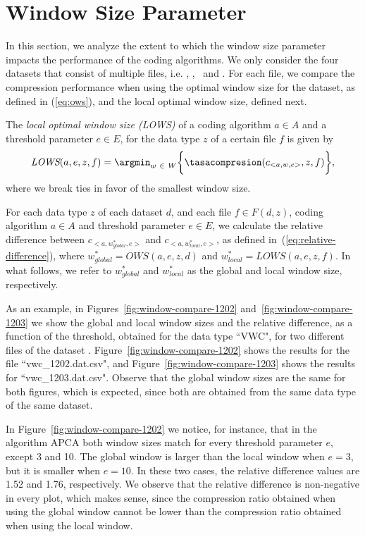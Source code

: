 
\clearpage
\section{Window Size Parameter}
\label{secX:windows}

In this section, we analyze the extent to which the window size parameter impacts the performance of the coding algorithms. We only consider the four datasets that consist of multiple files, i.e. \datasetirkis, \datasetsst, \datasetadcp \ and \datasetsolar. For each file, we compare the compression performance when using the optimal window size for the dataset, as defined in (\ref{eq:ows}), and the local optimal window size, defined next.


\newcommand{\lows}{\textit{LOWS}}
\begin{defcion}
The \textit{local optimal window size (\lows)} of a coding algorithm $a \in A$ and a threshold parameter $e \in E$, for the data type $z$ of a certain file $f$ is given by
\begin{equation}
\lows(a, e, z, f) = \argmin_{w\ \in \ W} \biggl\{ \tasacompresion(c_{<a, w, e>}, z, f) \biggr\},
\end{equation}
where we break ties in favor of the smallest window size.
\end{defcion}


For each data type $z$ of each dataset $d$, and each file $f \in F(d, z)$, coding algorithm $a \in A$ and threshold parameter $e \in E$, we calculate the relative difference between $c_{<a, w_{global}^{*}, e>}$ and $c_{<a, w_{local}^{*}, e>}$, as defined in~(\ref{eq:relative-difference}), where $w_{global}^{*}=OWS(a, e, z, d)$ and $w_{local}^{*}=LOWS(a, e, z, f)$. In what follows, we refer to $w_{global}^{*}$ and $w_{local}^{*}$ as the global and local window size, respectively.


As an example, in Figures~\ref{fig:window-compare-1202} and~\ref{fig:window-compare-1203} we show the global and local window sizes and the relative difference, as a function of the threshold, obtained for the data type ``VWC", for two different files of the dataset \datasetirkis. Figure~\ref{fig:window-compare-1202} shows the results for the file ``vwc\_1202.dat.csv", and Figure~\ref{fig:window-compare-1203} shows the results for ``vwc\_1203.dat.csv". Observe that the global window sizes are the same for both figures, which is expected, since both are obtained from the same data type of the same dataset.


In Figure~\ref{fig:window-compare-1202} we notice, for instance, that in the algorithm APCA both window sizes match for every threshold parameter $e$, except 3 and 10. The global window is larger than the local window when $e=3$, but it is smaller when $e=10$. In these two cases, the relative difference values are 1.52 and 1.76, respectively. We observe that the relative difference is non-negative in every plot, which makes sense, since the compression ratio obtained when using the global window cannot be lower than the compression ratio obtained when using the local window.


